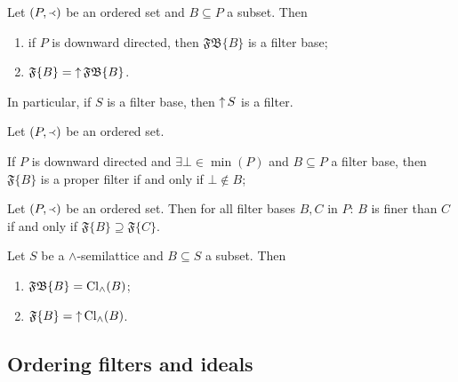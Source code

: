 \begin{proposition}
Let $\left( P,\Yleft \right)$ be an ordered set and $B\subseteq P$ a subset. Then
\begin{enumerate}
\item if $P$ is downward directed, then $\mathfrak{FB}\{B\}$ is a filter base;
\item $\mathfrak{F}\{B\} = \operatorname{\uparrow}\mathfrak{FB}\{B\}$.
\end{enumerate}
\end{proposition}
In particular, if $S$ is a filter base, then $\operatorname{\uparrow} S$ is a filter.

\begin{lemma}
Let $\left( P,\Yleft \right)$ be an ordered set.

If $P$ is downward directed and $\exists \bot \in \min(P)$ and $B \subseteq P$ a filter base, then $\mathfrak{F}\{B\}$ is a proper filter \textup{if and only if} $\bot \notin B$; 
\end{lemma}

\begin{proposition}
Let $\left( P,\Yleft \right)$ be an ordered set. Then for all filter bases $B,C$ in $P$: $B$ is finer than $C$ \textup{if and only if} $\mathfrak{F}\{B\} \supseteq \mathfrak{F}\{C\}$.
\end{proposition}

\begin{proposition} \label{filterGenerationSemilattice}
Let $S$ be a $\wedge$-semilattice and $B\subseteq S$ a subset. Then
\begin{enumerate}
\item $\mathfrak{FB}\{B\} = \operatorname{Cl}_\wedge(B)$;
\item $\mathfrak{F}\{B\} = \operatorname{\uparrow}\operatorname{Cl}_\wedge(B)$.
\end{enumerate}
\end{proposition}

\subsection{Ordering filters and ideals}

